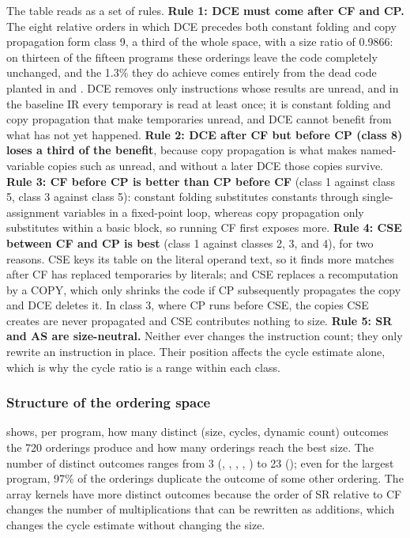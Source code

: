 The table reads as a set of rules. \textbf{Rule 1: DCE must come after CF and CP.} The eight relative orders in which DCE precedes both constant folding and copy propagation form class 9, a third of the whole space, with a size ratio of 0.9866: on thirteen of the fifteen programs these orderings leave the code completely unchanged, and the 1.3\% they do achieve comes entirely from the dead code planted in  and . DCE removes only instructions whose results are unread, and in the baseline IR every temporary is read at least once; it is constant folding and copy propagation that make temporaries unread, and DCE cannot benefit from what has not yet happened. \textbf{Rule 2: DCE after CF but before CP (class 8) loses a third of the benefit}, because copy propagation is what makes named-variable copies such as  unread, and without a later DCE those copies survive. \textbf{Rule 3: CF before CP is better than CP before CF} (class 1 against class 5, class 3 against class 5): constant folding substitutes constants through single-assignment variables in a fixed-point loop, whereas copy propagation only substitutes within a basic block, so running CF first exposes more. \textbf{Rule 4: CSE between CF and CP is best} (class 1 against classes 2, 3, and 4), for two reasons. CSE keys its table on the literal operand text, so it finds more matches after CF has replaced temporaries by literals; and CSE replaces a recomputation by a COPY, which only shrinks the code if CP subsequently propagates the copy and DCE deletes it. In class 3, where CP runs before CSE, the copies CSE creates are never propagated and CSE contributes nothing to size. \textbf{Rule 5: SR and AS are size-neutral.} Neither ever changes the instruction count; they only rewrite an instruction in place. Their position affects the cycle estimate alone, which is why the cycle ratio is a range within each class.

\subsubsection*{Structure of the ordering space}

 shows, per program, how many distinct (size, cycles, dynamic count) outcomes the 720 orderings produce and how many orderings reach the best size. The number of distinct outcomes ranges from 3 (, , , , ) to 23 (\code{2mm}); even for the largest program, 97\% of the orderings duplicate the outcome of some other ordering. The array kernels have more distinct outcomes because the order of SR relative to CF changes the number of multiplications that can be rewritten as additions, which changes the cycle estimate without changing the size.

